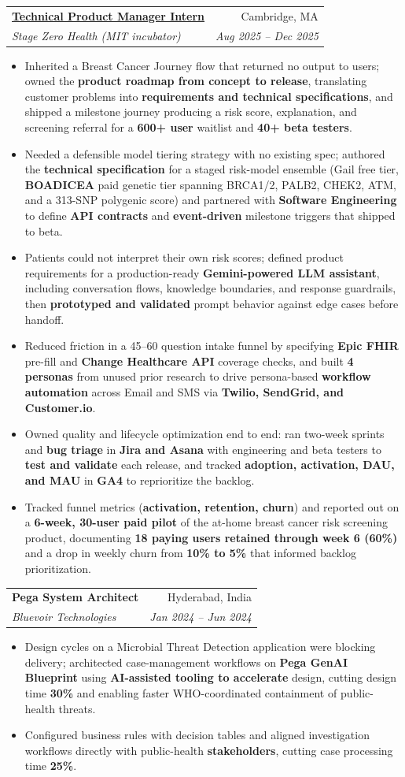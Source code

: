 \documentclass[letterpaper,11pt]{article}
\makeatletter
\newcommand{\resumeItem}[1]{
  \item\small{#1 \vspace{-3pt}}
}
\newcommand{\resumeSubheading}[4]{
  \vspace{-1pt}\item
    \begin{tabular*}{0.97\textwidth}[t]{l@{\extracolsep{\fill}}r}
      \textbf{#1} & #2 \\
      \textit{\small#3} & \textit{\small #4} \\
    \end{tabular*}\vspace{-7pt}
}
\newcommand{\resumeItemListStart}{\begin{itemize}[leftmargin=*, itemsep=0pt]}
\newcommand{\resumeItemListEnd}{\end{itemize}\vspace{-5pt}}
\makeatother
\begin{document}
  \resumeSubheading
    {\href{https://thisisjayk.github.io/Portfolio/\#work/stage-zero-health}{\underline{Technical Product Manager Intern}}}{Cambridge, MA}
    {Stage Zero Health (MIT incubator)}{Aug 2025 -- Dec 2025}
  \resumeItemListStart
    \resumeItem{Inherited a Breast Cancer Journey flow that returned no output to users; owned the \textbf{product roadmap from concept to release}, translating customer problems into \textbf{requirements and technical specifications}, and shipped a milestone journey producing a risk score, explanation, and screening referral for a \textbf{600+ user} waitlist and \textbf{40+ beta testers}.}
    \resumeItem{Needed a defensible model tiering strategy with no existing spec; authored the \textbf{technical specification} for a staged risk-model ensemble (Gail free tier, \textbf{BOADICEA} paid genetic tier spanning BRCA1/2, PALB2, CHEK2, ATM, and a 313-SNP polygenic score) and partnered with \textbf{Software Engineering} to define \textbf{API contracts} and \textbf{event-driven} milestone triggers that shipped to beta.}
    \resumeItem{Patients could not interpret their own risk scores; defined product requirements for a production-ready \textbf{Gemini-powered LLM assistant}, including conversation flows, knowledge boundaries, and response guardrails, then \textbf{prototyped and validated} prompt behavior against edge cases before handoff.}
    \resumeItem{Reduced friction in a 45--60 question intake funnel by specifying \textbf{Epic FHIR} pre-fill and \textbf{Change Healthcare API} coverage checks, and built \textbf{4 personas} from unused prior research to drive persona-based \textbf{workflow automation} across Email and SMS via \textbf{Twilio, SendGrid, and Customer.io}.}
    \resumeItem{Owned quality and lifecycle optimization end to end: ran two-week sprints and \textbf{bug triage} in \textbf{Jira and Asana} with engineering and beta testers to \textbf{test and validate} each release, and tracked \textbf{adoption, activation, DAU, and MAU} in \textbf{GA4} to reprioritize the backlog.}
    \resumeItem{Tracked funnel metrics (\textbf{activation, retention, churn}) and reported out on a \textbf{6-week, 30-user paid pilot} of the at-home breast cancer risk screening product, documenting \textbf{18 paying users retained through week 6 (60\%)} and a drop in weekly churn from \textbf{10\% to 5\%} that informed backlog prioritization.}
  \resumeItemListEnd

  \resumeSubheading
    {Pega System Architect}{Hyderabad, India}
    {Bluevoir Technologies}{Jan 2024 -- Jun 2024}
  \resumeItemListStart
    \resumeItem{Design cycles on a Microbial Threat Detection application were blocking delivery; architected case-management workflows on \textbf{Pega GenAI Blueprint} using \textbf{AI-assisted tooling to accelerate} design, cutting design time \textbf{30\%} and enabling faster WHO-coordinated containment of public-health threats.}
    \resumeItem{Configured business rules with decision tables and aligned investigation workflows directly with public-health \textbf{stakeholders}, cutting case processing time \textbf{25\%}.}
  \resumeItemListEnd
\end{document}
